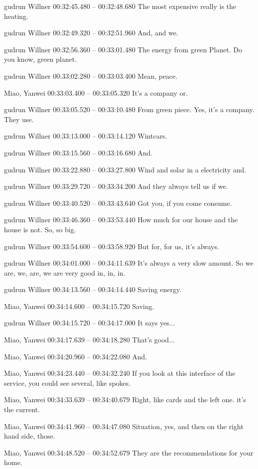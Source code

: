 {gudrun Willner 00:32:45.480 -- 00:32:48.680
The most expensive really is the heating.

gudrun Willner 00:32:49.320 -- 00:32:51.960
And, and we.

gudrun Willner 00:32:56.360 -- 00:33:01.480
The energy from green Planet. Do you know, green planet.

gudrun Willner 00:33:02.280 -- 00:33:03.400
Mean, peace.

Miao, Yanwei 00:33:03.400 -- 00:33:05.320
It's a company or.

gudrun Willner 00:33:05.520 -- 00:33:10.480
From green piece. Yes, it's a company. They use.

gudrun Willner 00:33:13.000 -- 00:33:14.120
Wintcars.

gudrun Willner 00:33:15.560 -- 00:33:16.680
And.

gudrun Willner 00:33:22.880 -- 00:33:27.800
Wind and solar in a electricity and.

gudrun Willner 00:33:29.720 -- 00:33:34.200
And they always tell us if we.

gudrun Willner 00:33:40.520 -- 00:33:43.640
Got you, if you come consume.

gudrun Willner 00:33:46.360 -- 00:33:53.440
How much for our house and the house is not. So, so big.

gudrun Willner 00:33:54.600 -- 00:33:58.920
But for, for us, it's always.

gudrun Willner 00:34:01.000 -- 00:34:11.639
It's always a very slow amount. So we are, we, are, we are very good in, in, in.

gudrun Willner 00:34:13.560 -- 00:34:14.440
Saving energy.

Miao, Yanwei 00:34:14.600 -- 00:34:15.720
Saving.

gudrun Willner 00:34:15.720 -- 00:34:17.000
It says yes...

Miao, Yanwei 00:34:17.639 -- 00:34:18.280
That's good...

Miao, Yanwei 00:34:20.960 -- 00:34:22.080
And.

Miao, Yanwei 00:34:23.440 -- 00:34:32.240
If you look at this interface of the service, you could see several, like spokes.

Miao, Yanwei 00:34:33.639 -- 00:34:40.679
Right, like cards and the left one. it's the current.

Miao, Yanwei 00:34:41.960 -- 00:34:47.080
Situation, yes, and then on the right hand side, those.

Miao, Yanwei 00:34:48.520 -- 00:34:52.679
They are the recommendations for your home.

}
